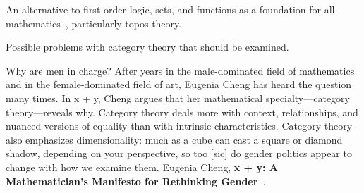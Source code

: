 \documentclass[11pt,openany]{book}
\begin{document}
An alternative to first order logic, sets, 
and functions as a foundation for all
mathematics~\cite{Feferman:1977:CategoricalFoundations},  
particularly topos theory.


\setcounter{currentlevel}{\value{baseSectionLevel}}
\label{sec:Doubts}

Possible problems with category theory that should be examined.


\label{sec:Hype}

\begin{boxquote}
Why are men in charge? 
After years in the male-dominated field of mathematics 
and in the female-dominated field of art, 
Eugenia Cheng has heard the question many times. 
In x + y, Cheng argues that her mathematical 
specialty---category theory---reveals why. 
Category theory deals more with context, relationships, 
and nuanced versions of equality than 
with intrinsic characteristics. 
Category theory also emphasizes dimensionality: 
much as a cube can cast a square or diamond shadow, 
depending on your perspective, 
so too [sic] do gender politics appear to change 
with how we examine them. 
\tcblower
{Eugenia Cheng, \textbf{x + y:
A Mathematician’s Manifesto for Rethinking 
Gender}~\cite{Cheng:2020:Latest}.}
\end{boxquote}
\end{document}
